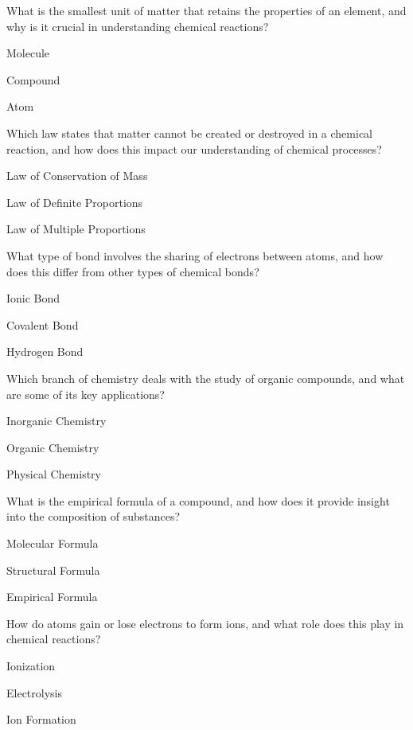 
\begin{enhancedmcq}{What is the smallest unit of matter that retains the properties of an element, and why is it crucial in understanding chemical reactions?}
\item Molecule
\item Compound
\item Atom

\end{enhancedmcq}
\begin{enhancedmcq}{Which law states that matter cannot be created or destroyed in a chemical reaction, and how does this impact our understanding of chemical processes?}
\item Law of Conservation of Mass
\item Law of Definite Proportions
\item Law of Multiple Proportions

\end{enhancedmcq}
\begin{enhancedmcq}{What type of bond involves the sharing of electrons between atoms, and how does this differ from other types of chemical bonds?}
\item Ionic Bond
\item Covalent Bond
\item Hydrogen Bond

\end{enhancedmcq}
\begin{enhancedmcq}{Which branch of chemistry deals with the study of organic compounds, and what are some of its key applications?}
\item Inorganic Chemistry
\item Organic Chemistry
\item Physical Chemistry

\end{enhancedmcq}
\begin{enhancedmcq}{What is the empirical formula of a compound, and how does it provide insight into the composition of substances?}
\item Molecular Formula
\item Structural Formula
\item Empirical Formula

\end{enhancedmcq}
\begin{enhancedmcq}{How do atoms gain or lose electrons to form ions, and what role does this play in chemical reactions?}
\item Ionization
\item Electrolysis
\item Ion Formation

\end{enhancedmcq}
